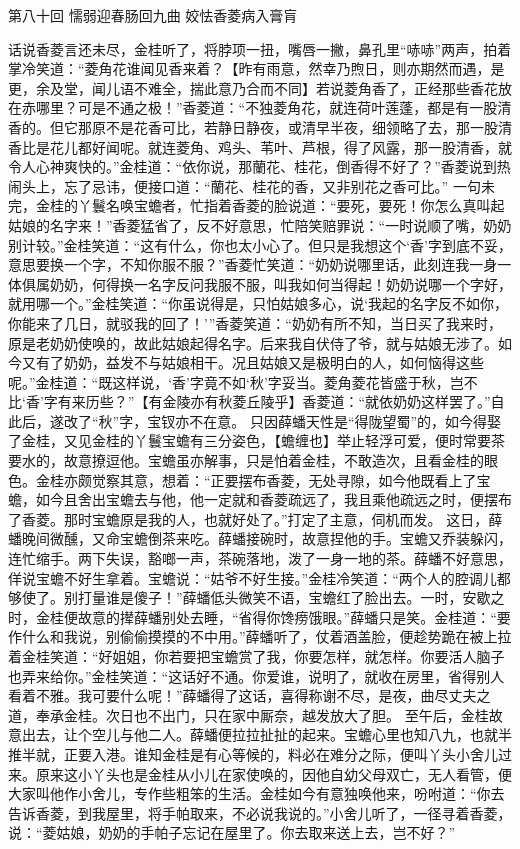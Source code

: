 \documentclass[12pt,oneside]{book}
\begin{document}
 
第八十回  懦弱迎春肠回九曲 姣怯香菱病入膏肓


话说香菱言还未尽，金桂听了，将脖项一扭，嘴唇一撇，鼻孔里“哧哧”两声，拍着掌冷笑道：“菱角花谁闻见香来着？【昨有雨意，然幸乃煦日，则亦期然而遇，是更，余及堂，闻儿语不难全，揣此意乃合而不同】若说菱角香了，正经那些香花放在赤哪里？可是不通之极！”香菱道：“不独菱角花，就连荷叶莲蓬，都是有一股清香的。但它那原不是花香可比，若静日静夜，或清早半夜，细领略了去，那一股清香比是花儿都好闻呢。就连菱角、鸡头、苇叶、芦根，得了风露，那一股清香，就令人心神爽快的。”金桂道：“依你说，那蘭花、桂花，倒香得不好了？”香菱说到热闹头上，忘了忌讳，便接口道：“蘭花、桂花的香，又非别花之香可比。”
一句未完，金桂的丫鬟名唤宝蟾者，忙指着香菱的脸说道：“要死，要死！你怎么真叫起姑娘的名字来！”香菱猛省了，反不好意思，忙陪笑赔罪说：“一时说顺了嘴，奶奶别计较。”金桂笑道：“这有什么，你也太小心了。但只是我想这个‘香’字到底不妥，意思要换一个字，不知你服不服？”香菱忙笑道：“奶奶说哪里话，此刻连我一身一体俱属奶奶，何得换一名字反问我服不服，叫我如何当得起！奶奶说哪一个字好，就用哪一个。”金桂笑道：“你虽说得是，只怕姑娘多心，说‘我起的名字反不如你，你能来了几日，就驳我的回了！’”香菱笑道：“奶奶有所不知，当日买了我来时，原是老奶奶使唤的，故此姑娘起得名字。后来我自伏侍了爷，就与姑娘无涉了。如今又有了奶奶，益发不与姑娘相干。况且姑娘又是极明白的人，如何恼得这些呢。”金桂道：“既这样说，‘香’字竟不如‘秋’字妥当。菱角菱花皆盛于秋，岂不比‘香’字有来历些？”【有金陵亦有秋菱丘陵乎】香菱道：“就依奶奶这样罢了。”自此后，遂改了“秋”字，宝钗亦不在意。
只因薛蟠天性是“得陇望蜀”的，如今得娶了金桂，又见金桂的丫鬟宝蟾有三分姿色，【蟾缠也】举止轻浮可爱，便时常要茶要水的，故意撩逗他。宝蟾虽亦解事，只是怕着金桂，不敢造次，且看金桂的眼色。金桂亦颇觉察其意，想着：“正要摆布香菱，无处寻隙，如今他既看上了宝蟾，如今且舍出宝蟾去与他，他一定就和香菱疏远了，我且乘他疏远之时，便摆布了香菱。那时宝蟾原是我的人，也就好处了。”打定了主意，伺机而发。
这日，薛蟠晚间微醺，又命宝蟾倒茶来吃。薛蟠接碗时，故意捏他的手。宝蟾又乔装躲闪，连忙缩手。两下失误，豁啷一声，茶碗落地，泼了一身一地的茶。薛蟠不好意思，佯说宝蟾不好生拿着。宝蟾说：“姑爷不好生接。”金桂冷笑道：“两个人的腔调儿都够使了。别打量谁是傻子！”薛蟠低头微笑不语，宝蟾红了脸出去。一时，安歇之时，金桂便故意的撵薛蟠别处去睡，“省得你馋痨饿眼。”薛蟠只是笑。金桂道：“要作什么和我说，别偷偷摸摸的不中用。”薛蟠听了，仗着酒盖脸，便趁势跪在被上拉着金桂笑道：“好姐姐，你若要把宝蟾赏了我，你要怎样，就怎样。你要活人脑子也弄来给你。”金桂笑道：“这话好不通。你爱谁，说明了，就收在房里，省得别人看着不雅。我可要什么呢！”薛蟠得了这话，喜得称谢不尽，是夜，曲尽丈夫之道，奉承金桂。次日也不出门，只在家中厮奈，越发放大了胆。
至午后，金桂故意出去，让个空儿与他二人。薛蟠便拉拉扯扯的起来。宝蟾心里也知八九，也就半推半就，正要入港。谁知金桂是有心等候的，料必在难分之际，便叫丫头小舍儿过来。原来这小丫头也是金桂从小儿在家使唤的，因他自幼父母双亡，无人看管，便大家叫他作小舍儿，专作些粗笨的生活。金桂如今有意独唤他来，吩咐道：“你去告诉香菱，到我屋里，将手帕取来，不必说我说的。”小舍儿听了，一径寻着香菱，说：“菱姑娘，奶奶的手帕子忘记在屋里了。你去取来送上去，岂不好？”
\end{document}
